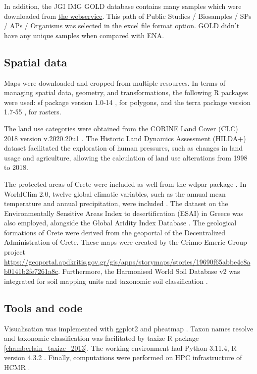 In addition, the JGI IMG GOLD database contains many samples which were downloaded from \href{https://gold.jgi.doe.gov/downloads}{the webservice}.
This path of Public Studies / Biosamples / SPs / APs / Organisms was selected in the excel file format option. 
GOLD didn't have any unique samples when compared with ENA.

\subsection{Spatial data}\label{crete_spatial}

Maps were downloaded and cropped from multiple resources.
In terms of managing spatial data, geometry, and transformations, the following
R packages were used:
sf package version 1.0-14 \parencite{Pebesma2023}, for polygons, and the terra
package version 1.7-55 \parencite{hijmans2024terra}, for rasters.

The land use categories were obtained from the CORINE Land Cover (CLC) 2018
version v.2020.20u1 \parencite{CLC2023}.
The Historic Land Dynamics Assessment (HILDA+) dataset \parencite{winkler2021global}
facilitated the exploration of human pressures, such as changes in land usage and agriculture,
allowing the calculation of land use alterations from 1998 to 2018.

The protected areas of Crete were included as well from the wdpar package \parencite{Hanson2022}.
In WorldClim 2.0, twelve global climatic variables, such as the annual mean
temperature and annual precipitation, were included \parencite{Fick2017}.
The dataset on the Environmentally Sensitive Areas Index to desertification (ESAI)
in Greece \parencite{KARAMESOUTI2018266} was also employed, alongside the
Global Aridity Index Database \parencite{zomer2022version}.
The geological formations of Crete were derived from the geoportal of the
Decentralized Administration of Crete. These maps were created by the Crinno-Emeric Group
project \url{https://geoportal.apdkritis.gov.gr/gis/apps/storymaps/stories/19690f65abbe4e8ab0141b2fe7261a8c}.
Furthermore, the Harmonised World Soil Database v2 was integrated for soil mapping units and taxonomic soil classification \parencite{fao2023}.

\subsection{Tools and code}\label{Coding environment}
Visualisation was implemented with ggplot2 \parencite{wickham_ggplot2_2016} and pheatmap \parencite{Kolde2019}.
Taxon names resolve and taxonomic classification was facilitated by taxize R package \ref{chamberlain_taxize_2013}.
The working environment had Python 3.11.4, R version 4.3.2 \parencite{rcoreteam}.
Finally, computations were performed on HPC infrastructure of HCMR \parencite{zafeiropoulos_0s_2021}.

